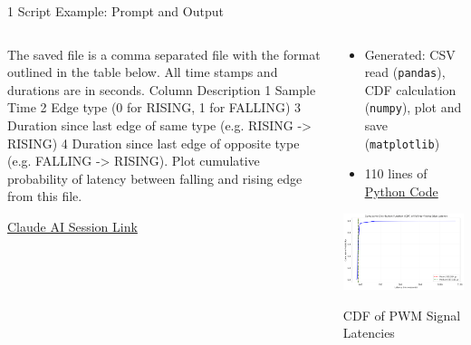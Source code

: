 \documentclass[xcolor=dvipsnames, aspectratio=169]{beamer}
\begin{document}
\begin{frame}[fragile]{1 Script Example: Prompt and Output}
  \begin{columns}
    \begin{column}{0.6\textwidth}
    \begin{promptbox}
      The saved file is a comma separated file with the format outlined in the table below. All time stamps and durations are in seconds. Column Description 1 Sample Time 2 Edge type (0 for RISING, 1 for FALLING) 3 Duration since last edge of same type (e.g. RISING -> RISING) 4 Duration since last edge of opposite type (e.g. FALLING -> RISING). Plot cumulative probability of latency between falling and rising edge from this file.      
    \end{promptbox}
      \small\href{https://claude.ai/share/7e11fde4-bb5e-476e-b8f3-9dad820724f5}{Claude AI Session Link}
    \end{column}
    
    \begin{column}{0.4\textwidth}
      \begin{itemize}
        \item Generated: CSV read (\texttt{pandas}), CDF calculation (\texttt{numpy}), plot and save (\texttt{matplotlib})
        \item 110 lines of \href{https://github.com/neu-ece-esl/ai-prog-workshop/blob/main/1-script/analyze_latency.py}{Python Code}
      \end{itemize}
      \includegraphics[width=\textwidth]{../1-script/pwm_sleep_edges_loaded_latency_cdf.png}
      \small\centerline{CDF of PWM Signal Latencies}
      
    \end{column}
  \end{columns}
\end{frame}
\end{document}
